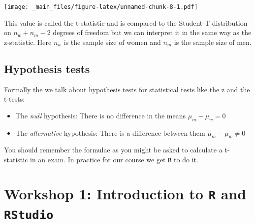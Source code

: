 \documentclass[
]{gitbook}
\providecommand{\tightlist}{%
  \setlength{\itemsep}{0pt}\setlength{\parskip}{0pt}}
\begin{document}
\texttt{[image: \_main\_files/figure-latex/unnamed-chunk-8-1.pdf]}

\newpage


This value is called the t-statistic and is compared to the Student-T distribution on \(n_w + n_m - 2\) degrees of freedom but we can interpret it in the same way as the z-statistic. Here \(n_w\) is the sample size of women and \(n_m\) is the sample size of men.

\hypertarget{hypothesis-tests}{%
\subsection{Hypothesis tests}\label{hypothesis-tests}}

Formally the we talk about hypothesis tests for statistical tests like the z and the t-tests:

\begin{itemize}
\tightlist
\item
  The \emph{null} hypothesis: There is no difference in the means \(\mu_{m}-\mu_{w}=0\)
\item
  The \emph{alternative} hypothesis: There is a difference between them \(\mu_{m}-\mu_{w} \neq 0\)
\end{itemize}


You should remember the formulae as you might be asked to calculate a t-statistic in an exam. In practice for our course we get \texttt{R} to do it.

\hypertarget{workshop-1-introduction-to-r-and-rstudio}{%
\section{\texorpdfstring{Workshop 1: Introduction to \texttt{R} and \texttt{RStudio}}{Workshop 1: Introduction to R and RStudio}}\label{workshop-1-introduction-to-r-and-rstudio}}
\end{document}

